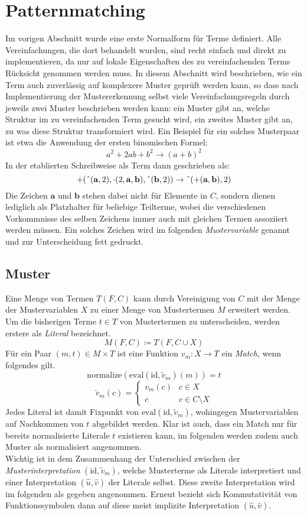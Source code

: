 \documentclass{scrartcl}
\begin{document}
\section{Patternmatching}
Im vorigen Abschnitt wurde eine erste Normalform für Terme definiert. Alle Vereinfachungen, die dort behandelt wurden, sind recht einfach und direkt zu implementieren, da nur auf lokale Eigenschaften des zu vereinfachenden Terms Rücksicht genommen werden muss. In diesem Abschnitt wird beschrieben, wie ein Term auch zuverlässig auf komplexere Muster geprüft werden kann, so dass nach Implementierung der Mustererkennung selbst viele Vereinfachungsregeln durch jeweils zwei Muster beschrieben werden kann: ein Muster gibt an, welche Struktur im zu vereinfachenden Term gesucht wird, ein zweites Muster gibt an, zu was diese Struktur transformiert wird. Ein Beispiel für ein solches Musterpaar ist etwa die Anwendung der ersten binomischen Formel:
$$a^2 + 2 a b + b^2 \rightarrow (a + b)^2$$
In der etablierten Schreibweise als Term dann geschrieben als:
$$+(\string^(\mathbf a, 2), \cdot(2, \mathbf a, \mathbf b), \string^(\mathbf b, 2)) \rightarrow \string^(+(\mathbf a, \mathbf b), 2)$$
Die Zeichen $\mathbf a$ und $\mathbf b$ stehen dabei nicht für Elemente in $C$, sondern dienen lediglich als Platzhalter für beliebige Teilterme, wobei die verschiedenen Vorkommnisse des selben Zeichens immer auch mit gleichen Termen assoziiert werden müssen. Ein solches Zeichen wird im folgenden \emph{Mustervariable} genannt und zur Unterscheidung fett gedruckt.

\subsection{Muster}
Eine Menge von Termen $T(F, C)$ kann durch Vereinigung von $C$ mit der Menge der Mustervariablen $X$ zu einer Menge von Mustertermen $M$ erweitert werden. 
Um die bisherigen Terme $t \in T$ von Mustertermen zu unterscheiden, werden erstere als \emph{Literal} bezeichnet.
$$M(F, C) \coloneqq T(F, C \cup X)$$
Für ein Paar $(m, t) \in M \times T$ ist eine Funktion $v_m \colon X \rightarrow T$ ein \emph{Match}, wenn folgendes gilt.
$$\mathrm{normalize}(\mathrm{eval}(\mathrm{id}, \tilde v_m)(m))= t$$
$$\tilde v_m(c) = \begin{cases}
	v_m(c) & c \in X\\
	c         & c \in C \setminus X
\end{cases}$$
Jedes Literal ist damit Fixpunkt von $\mathrm{eval}(\mathrm{id}, \tilde v_m)$, wohingegen Mustervariablen auf Nachkommen von $t$ abgebildet werden. 
Klar ist auch, dass ein Match nur für bereits normalisierte Literale $t$ existieren kann, im folgenden werden zudem auch Muster als normalisiert angenommen.\\
Wichtig ist in dem Zusammenhang der Unterschied zwischen der \emph{Musterinterpretation} $(\mathrm{id}, \tilde v_m)$, welche Musterterme als Literale interpretiert und einer Interpretation $(\hat{u}, \hat{v})$ der Literale selbst. Diese zweite Interpretation wird im folgenden als gegeben angenommen. Erneut bezieht sich Kommutativität von Funktionssymbolen dann auf diese meist implizite Interpretation $(\hat u, \hat v)$.\\
\end{document}
